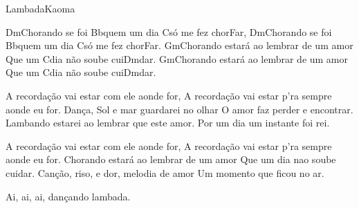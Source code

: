 \begin{musica}{Lambada}{Kaoma}{}

\ac{Dm}{Cho}rando se foi \ac{Bb}{quem} um dia \ac{C}{só} me fez chor\ac{F}{ar},
\ac{Dm}{Cho}rando se foi \ac{Bb}{quem} um dia \ac{C}{só} me fez chor\ac{F}{ar}.
\ac{Gm}{Cho}rando estará ao lembrar de um amor
Que um \ac{C}{dia} não soube cui\ac{Dm}{dar}.
\ac{Gm}{Cho}rando estará ao lembrar de um amor
Que um \ac{C}{dia} não soube cui\ac{Dm}{dar}.

A recordação vai estar com ele aonde for,
A recordação vai estar p’ra sempre aonde eu for.
Dança, Sol e mar guardarei no olhar
O amor faz perder e encontrar.
Lambando estarei ao lembrar que este amor.
Por um dia um instante foi rei.


A recordação vai estar com ele aonde for,
A recordação vai estar p’ra sempre aonde eu for.
Chorando estará ao lembrar de um amor
Que um dia nao soube cuidar.
Canção, riso, e dor, melodia de amor
Um momento que ficou no ar.


Ai, ai, ai, dançando lambada.

\end{musica}
